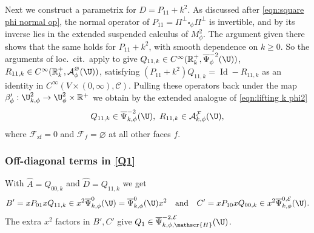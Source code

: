 \documentclass[JEP,XML,SOM,Unicode,NoFloatCountersInSection,published]{cedram}
\theoremstyle{plain}
\theoremstyle{definition}
\newcommand{\R}{{\mathbb{R}}}
\newcommand\calA{{\mathcal A}}
\newcommand\calE{{\mathcal E}}
\newcommand\calF{{\mathcal F}}
\newcommand{\zf}{{\mathrm{zf}}}
\DeclareMathOperator{\Id}{Id}
\newcommand{\Cinf}{C^\infty}
\newcommand{\Piperp}{\Pi^\perp}
\newcommand{\Psibar}{\overline{\Psi}}
\begin{document}
Next we construct a parametrix for $D=P_{11}+k^2$.
As discussed after \eqref{eqn:square phi normal op}, the normal operator of $P_{11}=\Piperp\square_\phi\Piperp$ is invertible, and by \cite[Prop.\,2.3]{grieser-para} its inverse lies in the extended suspended calculus of $M^2_\phi$. The argument given there shows that the same holds for $P_{11}+k^2$, with smooth dependence on $k\geq0$. So the arguments of loc.\ cit.\ apply to give $Q_{11,k} \in\Cinf(\R_{k}^+,\Psibar^{-2}_\phi(\U))$, $R_{11,k}\in\Cinf(\R_{k}^+,\calA^{\varnothing}_\phi(\U))$, satisfying $(P_{11}+k^2)Q_{11,k}=\Id - R_{11,k}$ as an identity in $\Cinf(V\times(0,\infty),\mathscr{C})$.
Pulling these operators back under the map $\beta'_{\phi} : \U^{2}_{k,\phi} \to \U^{2}_{\phi}\times \R^+$ we obtain by the extended analogue of \eqref{eqn:lifting k phi2}
\[
Q_{11,k}\in \Psibar^{-2}_{k,\phi}(\U),\ R_{11,k} \in \calA^{\calF}_{k,\phi}(\U),
\]
where $\calF_\zf=0$ and $\calF_f=\varnothing$ at all other faces $f$.

\subsubsection*{Off-diagonal terms in \eqref{Q1}}
With $\widehat{A}=Q_{00,k}$ and $\widehat{D}=Q_{11,k}$ we get
\[
B'=xP_{01}x Q_{11,k}\in x^2\Psibar^{0}_{k,\phi}(\U)=\Psibar^{0}_{k,\phi}(\U) x^2\quad\text{and}\quad C'=xP_{10}x Q_{00,k} \in x^2\Psibar_{k,\phi}^{0,\calE}(\U).
\]
The extra $x^2$ factors in $B',C'$ give $Q_1\in \Psibar_{k,\phi,\mathscr{H}}^{-2,\calE}(\U)$.
\end{document}

